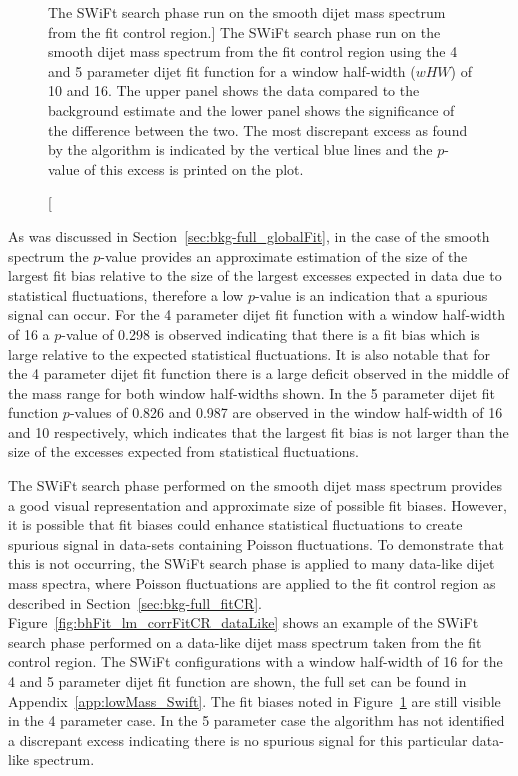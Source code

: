 \begin{figure}[!htb]
\caption
    [The SWiFt search phase run on the smooth dijet mass spectrum from the \lm{} fit control region.]
    {\label{fig:bhFit_lm_corrFitCR_smooth}
      The SWiFt search phase run on the smooth dijet mass spectrum from the \lm{} fit control region
      using the 4 and 5 parameter dijet fit function for a window half-width ($wHW$) of 10 and 16.
      The upper panel shows the data compared to the background estimate and the lower panel shows the significance of the difference between the two.
      The most discrepant excess as found by the \bh{} algorithm is indicated by the vertical blue lines and the \mbox{$p$-value} of this excess is printed on the plot. }
\end{figure}

As was discussed in Section~\ref{sec:bkg-full_globalFit}, in the case of the smooth spectrum the \bh{} \mbox{$p$-value} provides an approximate estimation
of the size of the largest fit bias relative to the size of the largest excesses expected in data due to statistical fluctuations,
therefore a low $p$-value is an indication that a spurious signal can occur. 
For the 4 parameter dijet fit function with a window half-width of 16 a \bh{} $p$-value of 0.298 is observed indicating that
there is a fit bias which is large relative to the expected statistical fluctuations.
It is also notable that for the 4 parameter dijet fit function there is a large deficit observed in the middle of the mass range for both window half-widths shown.
In the 5 parameter dijet fit function \bh{} $p$-values of 0.826 and 0.987 are observed in the window half-width of 16 and 10 respectively,
which indicates that the largest fit bias is not larger than the size of the excesses expected from statistical fluctuations.

The SWiFt search phase performed on the smooth dijet mass spectrum provides a good visual representation and approximate size of possible fit biases.
However, it is possible that fit biases could enhance statistical fluctuations to create spurious signal in data-sets containing Poisson fluctuations.
To demonstrate that this is not occurring, the SWiFt search phase is applied to many data-like dijet mass spectra,
where Poisson fluctuations are applied to the fit control region as described in Section~\ref{sec:bkg-full_fitCR}.
Figure~\ref{fig:bhFit_lm_corrFitCR_dataLike} shows an example of the SWiFt search phase performed on a data-like dijet mass spectrum taken from the fit control region.
The SWiFt configurations with a window half-width of 16 for the 4 and 5 parameter dijet fit function are shown, the full set can be found in Appendix~\ref{app:lowMass_Swift}.
The fit biases noted in Figure~\ref{fig:bhFit_lm_corrFitCR_smooth} are still visible in the 4 parameter case.
In the 5 parameter case the \bh{} algorithm has not identified a discrepant excess indicating
there is no spurious signal for this particular data-like spectrum.

